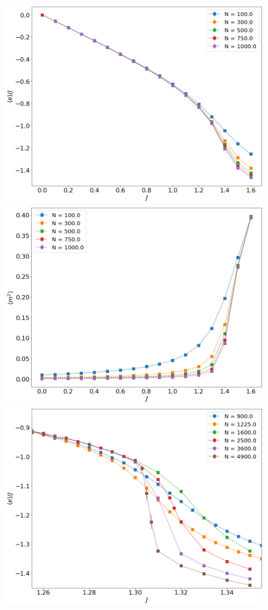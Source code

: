  \begin{figure}[H]
	\centering
	\includegraphics[scale=0.23]{Images/energy_shortchains.png}
	\includegraphics[scale=0.23]{Images/magnetization2_shortchains.png} \\
	\includegraphics[scale=0.23]{Images/energy_longchains.png}

\end{figure}
